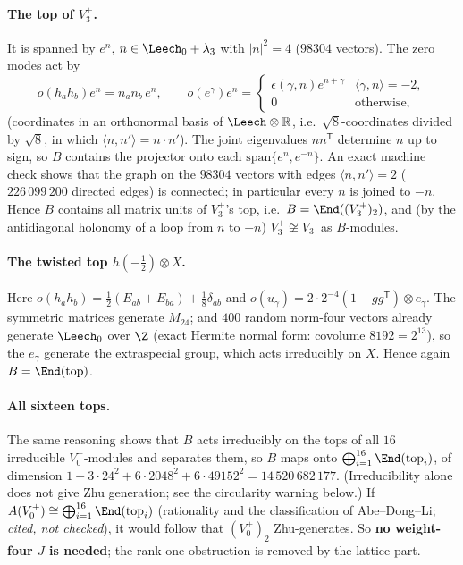 \paragraph{The top of $V_3^+$.}  It is spanned by $e^n$, $n\in\Leech_0+\lambda_3$ with $|n|^2=4$
($98304$ vectors).  The zero modes act by
\begin{equation*}
 o(h_ah_b)e^n = n_an_b\,e^n,\qquad o(e^\gamma)e^n = \begin{cases}\epsilon(\gamma,n)e^{n+\gamma}&\langle\gamma,n\rangle=-2,\\ 0&\text{otherwise,}\end{cases}
\end{equation*}
(coordinates in an orthonormal basis of $\Leech\otimes\mathbb{R}$, i.e.\ $\sqrt8$-coordinates divided by
$\sqrt8$, in which $\langle n,n'\rangle=n\cdot n'$).  The joint eigenvalues $nn^{\mathsf T}$ determine $n$ up to sign, so $B$
contains the projector onto each $\mathrm{span}\{e^n,e^{-n}\}$.  An exact machine check shows that
the graph on the $98304$ vectors with edges $\langle n,n'\rangle=2$ ($226\,099\,200$ directed edges)
is connected; in particular every $n$ is joined to $-n$.  Hence $B$ contains all matrix units of
$V_3^+$'s top, i.e.\ $B=\End((V_3^+)_2)$, and (by the antidiagonal holonomy of a loop from $n$ to
$-n$) $V_3^+\not\cong V_3^-$ as $B$-modules.

\paragraph{The twisted top $h(-\tfrac12)\otimes X$.}  Here $o(h_ah_b)=\tfrac12(E_{ab}+E_{ba})+\tfrac18\delta_{ab}$
and $o(u_\gamma)=2\cdot2^{-4}(1-gg^{\mathsf T})\otimes e_\gamma$.  The symmetric matrices generate
$M_{24}$; and $400$ random norm-four vectors already generate $\Leech_0$ over $\Z$ (exact Hermite normal
form: covolume $8192=2^{13}$), so the $e_\gamma$ generate the extraspecial group, which acts
irreducibly on $X$.  Hence again $B=\End(\text{top})$.

\paragraph{All sixteen tops.}  The same reasoning shows that $B$ acts irreducibly on the tops of all
$16$ irreducible $V_0^+$-modules and separates them, so $B$ maps onto
$\bigoplus_{i=1}^{16}\End(\text{top}_i)$, of dimension $1+3\cdot24^2+6\cdot2048^2+6\cdot49152^2 =
14\,520\,682\,177$.  (Irreducibility alone does not give Zhu generation; see the circularity warning below.)  If
$A(V_0^+)\cong\bigoplus_{i=1}^{16}\End(\text{top}_i)$ (rationality and the
classification of Abe--Dong--Li; \emph{cited, not checked}), it would follow that $(V_0^+)_2$
Zhu-generates.  So \textbf{no weight-four $J$ is needed}; the rank-one obstruction is removed by the
lattice part.

